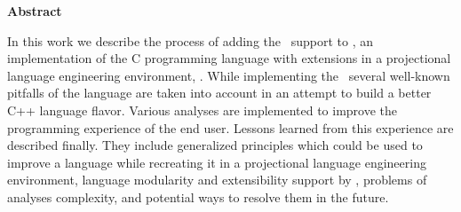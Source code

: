

\clearemptydoublepage
{}
{}	





\vspace*{2cm}
\begin{center}
{\Large \bf Abstract}
\end{center}
\vspace{1cm}

In this work we describe the process of adding the \cpppl\ support to \mbdp, an implementation of the
C programming language with extensions in a projectional language engineering environment, \jbmps. 
While implementing the \cpppl\ several well-known pitfalls of the language are taken into account
in an attempt to build a better C++ language flavor. Various analyses are implemented to improve
the programming experience of the end user. Lessons learned from this experience are described finally.
They include generalized principles which could be used to improve a language while recreating it in a 
projectional language engineering environment, language modularity and extensibility support by \jbmps,
problems of analyses complexity, and potential ways to resolve them in the future.